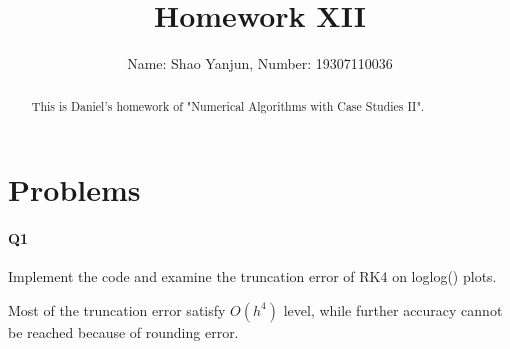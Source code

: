 \documentclass[11pt]{article}
\title{Homework XII}
\author{Name: Shao Yanjun, Number: 19307110036}
\begin{document}
\maketitle

\begin{abstract}
This is Daniel's homework of  "Numerical Algorithms with Case Studies II".
\end{abstract}
\section{Problems}
\paragraph{Q1}
Implement the code and examine the truncation error of RK4 on loglog() plots.
\begin{figure}[H]
	\centering
\end{figure}
Most of the truncation error satisfy $O(h^4)$ level, while further accuracy cannot be reached because of rounding error.
\end{document}
